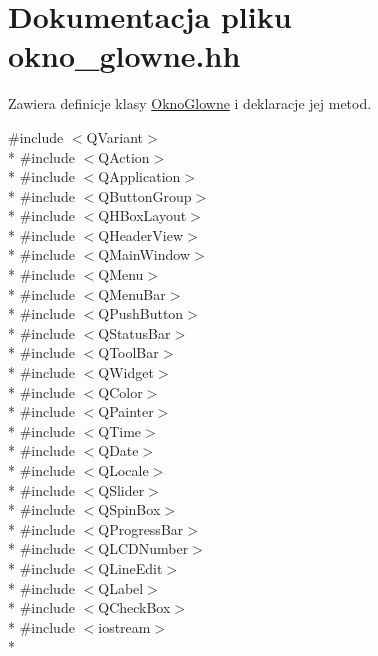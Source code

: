 \hypertarget{okno__glowne_8hh}{}\section{Dokumentacja pliku okno\+\_\+glowne.\+hh}
\label{okno__glowne_8hh}


Zawiera definicje klasy \hyperlink{class_okno_glowne}{Okno\+Glowne} i deklaracje jej metod.  


{\ttfamily \#include $<$Q\+Variant$>$}\\*
{\ttfamily \#include $<$Q\+Action$>$}\\*
{\ttfamily \#include $<$Q\+Application$>$}\\*
{\ttfamily \#include $<$Q\+Button\+Group$>$}\\*
{\ttfamily \#include $<$Q\+H\+Box\+Layout$>$}\\*
{\ttfamily \#include $<$Q\+Header\+View$>$}\\*
{\ttfamily \#include $<$Q\+Main\+Window$>$}\\*
{\ttfamily \#include $<$Q\+Menu$>$}\\*
{\ttfamily \#include $<$Q\+Menu\+Bar$>$}\\*
{\ttfamily \#include $<$Q\+Push\+Button$>$}\\*
{\ttfamily \#include $<$Q\+Status\+Bar$>$}\\*
{\ttfamily \#include $<$Q\+Tool\+Bar$>$}\\*
{\ttfamily \#include $<$Q\+Widget$>$}\\*
{\ttfamily \#include $<$Q\+Color$>$}\\*
{\ttfamily \#include $<$Q\+Painter$>$}\\*
{\ttfamily \#include $<$Q\+Time$>$}\\*
{\ttfamily \#include $<$Q\+Date$>$}\\*
{\ttfamily \#include $<$Q\+Locale$>$}\\*
{\ttfamily \#include $<$Q\+Slider$>$}\\*
{\ttfamily \#include $<$Q\+Spin\+Box$>$}\\*
{\ttfamily \#include $<$Q\+Progress\+Bar$>$}\\*
{\ttfamily \#include $<$Q\+L\+C\+D\+Number$>$}\\*
{\ttfamily \#include $<$Q\+Line\+Edit$>$}\\*
{\ttfamily \#include $<$Q\+Label$>$}\\*
{\ttfamily \#include $<$Q\+Check\+Box$>$}\\*
{\ttfamily \#include $<$iostream$>$}\\*
